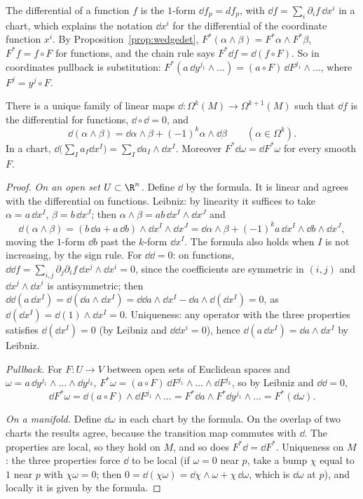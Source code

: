 The differential of a function $f$ is the $1$-form $\dd f_p=df_p$, with $\dd f=\sum_i\partial_if\,\dd x^i$ in a chart, which explains the notation $\dd x^i$ for the
differential of the coordinate function $x^i$. By Proposition~\ref{prop:wedgedet}, $F^*(\alpha\wedge\beta)=F^*\alpha\wedge F^*\beta$, $F^*f=f\circ F$ for functions, and the chain
rule says $F^*\dd f=\dd(f\circ F)$. So in coordinates pullback is substitution: $F^*(a\,\dd y^{j_1}\wedge\dots)=(a\circ F)\,\dd F^{j_1}\wedge\dots$, where
$F^j=y^j\circ F$.

\begin{theorem}\label{thm:extd}
There is a unique family of linear maps $\dd\colon\Omega^k(M)\to\Omega^{k+1}(M)$ such that $\dd f$ is the differential for functions, $\dd\circ\dd=0$, and
\[
\dd(\alpha\wedge\beta)=\dd\alpha\wedge\beta+(-1)^k\alpha\wedge\dd\beta\qquad(\alpha\in\Omega^k).
\]
In a chart, $\dd\bigl(\sum_Ia_I\dd x^I\bigr)=\sum_I\dd a_I\wedge\dd x^I$. Moreover $F^*\dd\omega=\dd F^*\omega$ for every smooth $F$.
\end{theorem}
\begin{proof}
\emph{On an open set $U\subset\R^n$.} Define $\dd$ by the formula. It is linear and agrees with the differential on functions. Leibniz: by linearity it
suffices to take $\alpha=a\,\dd x^I$, $\beta=b\,\dd x^J$; then $\alpha\wedge\beta=ab\,\dd x^I\wedge\dd x^J$ and
\[
\dd(\alpha\wedge\beta)=(b\,\dd a+a\,\dd b)\wedge\dd x^I\wedge\dd x^J=\dd\alpha\wedge\beta+(-1)^ka\,\dd x^I\wedge\dd b\wedge\dd x^J,
\]
moving the $1$-form $\dd b$ past the $k$-form $\dd x^I$. The formula also holds when $I$ is not increasing, by the sign rule. For $\dd\dd=0$: on functions,
$\dd\dd f=\sum_{i,j}\partial_j\partial_if\,\dd x^j\wedge\dd x^i=0$, since the coefficients are symmetric in $(i,j)$ and $\dd x^j\wedge\dd x^i$ is antisymmetric; then
$\dd\dd(a\,\dd x^I)=\dd(\dd a\wedge\dd x^I)=\dd\dd a\wedge\dd x^I-\dd a\wedge\dd(\dd x^I)=0$, as $\dd(\dd x^I)=\dd(1)\wedge\dd x^I=0$. Uniqueness: any operator with the three properties
satisfies $\dd(\dd x^I)=0$ (by Leibniz and $\dd\dd x^i=0$), hence $\dd(a\,\dd x^I)=\dd a\wedge\dd x^I$ by Leibniz.

\emph{Pullback.} For $F\colon U\to V$ between open sets of Euclidean spaces and $\omega=a\,\dd y^{j_1}\wedge\dots\wedge\dd y^{j_k}$,
$F^*\omega=(a\circ F)\,\dd F^{j_1}\wedge\dots\wedge\dd F^{j_k}$, so by Leibniz and $\dd\dd=0$,
\[
\dd F^*\omega=\dd(a\circ F)\wedge\dd F^{j_1}\wedge\dots=F^*\dd a\wedge F^*\dd y^{j_1}\wedge\dots=F^*(\dd\omega).
\]

\emph{On a manifold.} Define $\dd\omega$ in each chart by the formula. On the overlap of two charts the results agree, because the transition map commutes
with $\dd$. The properties are local, so they hold on $M$, and so does $F^*\dd=\dd F^*$. Uniqueness on $M$: the three properties force $\dd$ to be local (if
$\omega=0$ near $p$, take a bump $\chi$ equal to $1$ near $p$ with $\chi\omega=0$; then $0=\dd(\chi\omega)=\dd\chi\wedge\omega+\chi\,\dd\omega$, which is $\dd\omega$ at $p$), and locally
it is given by the formula.
\end{proof}

